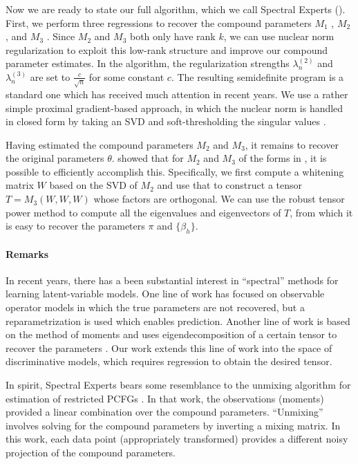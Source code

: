 Now we are ready to state our full algorithm, which we call Spectral Experts
().
First, we perform three regressions to recover the compound parameters
$M_1$ ,
$M_2$ , and
$M_3$ .
Since $M_2$ and $M_3$ both only have rank $k$,
we can use nuclear norm regularization
\cite{Tomioka2011,NegahbanWainwright2009}
to exploit this low-rank structure and improve our compound parameter estimates.
In the algorithm, the regularization strengths $\lambda_n^{(2)}$ and $\lambda_n^{(3)}$
are set to $\frac{c}{\sqrt{n}}$ for some constant $c$.
The resulting semidefinite program is a standard one which has received
much attention in recent years.
We use a rather simple proximal gradient-based approach,
in which the nuclear norm is handled in closed form by taking an SVD
and soft-thresholding the singular values \cite{donoho95soft,cai10soft}.

Having estimated the compound parameters $M_2$ and $M_3$,
it remains to recover the original parameters $\theta$.
\citet{AnandkumarGeHsu2012} showed that for $M_2$ and $M_3$ of
the forms in , it is possible to efficiently accomplish this.
Specifically, we first compute a whitening matrix $W$ based on the SVD of $M_2$
and use that to construct a tensor $T = M_3(W, W, W)$ whose factors are orthogonal.
We can use the robust tensor power method to compute all the
eigenvalues and eigenvectors of $T$, from which it is easy to recover
the parameters $\pi$ and $\{\beta_h\}$.

\paragraph{Remarks}

In recent years, there has a been substantial interest in ``spectral'' methods
for learning latent-variable models.  One line of work has
focused on observable operator models \cite{hsu09spectral}
in which the true parameters are not recovered, but a reparametrization is used
which enables prediction.
Another line of work is based on the method of moments and uses eigendecomposition of a certain tensor
to recover the parameters \cite{anandkumar12svd,anandkumar12moments,AnandkumarHsuKakade2012}.
Our work extends this line of work into the space of discriminative models,
which requires regression to obtain the desired tensor.

In spirit, Spectral Experts bears some resemblance to the unmixing
algorithm for estimation of restricted PCFGs
\cite{hsu12identifiability}.
In that work, the observations (moments) provided a linear combination over
the compound parameters.  ``Unmixing'' involves solving for the compound
parameters by inverting a mixing matrix.  In this work,
each data point (appropriately transformed) provides a different noisy projection of
the compound parameters.

